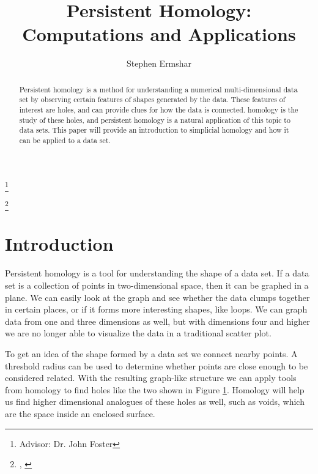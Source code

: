

\title[Persistent Homology]{Persistent Homology: Computations and Applications}
\author{Stephen Ermshar}
\address{Department of Mathematics, Walla Walla University, College Place, WA 99324}
\date{} %
\thanks{Advisor: Dr. John Foster}

\thanks{\tiny{\DTMtoday, \DTMcurrenttime}}
\rfoot{\hfill\newline\tiny{\DTMtoday, \DTMcurrenttime}}




\begin{abstract}
    Persistent homology is a method for understanding a numerical multi-dimensional data set by observing certain features of shapes generated by the data.
    These features of interest are holes, and can provide clues for how the data is connected.
    homology is the study of these holes, and persistent homology is a natural application of this topic to data sets.
    This paper will provide an introduction to simplicial homology and how it can be applied to a data set.
\end{abstract}
\maketitle

\section{Introduction}

Persistent homology is a tool for understanding the shape of a data set.
If a data set is a collection of points in two-dimensional space, then it can be graphed in a plane.
We can easily look at the graph and see whether the data clumps together in certain places, or if it forms more interesting shapes, like loops.
We can graph data from one and three dimensions as well, but with dimensions four and higher we are no longer able to visualize the data in a traditional scatter plot.

\begin{figure}[h]
    \centering
    \scalebox{0.75}{}
    \caption{}
    \label{fig:persistence-demo-r25}
\end{figure}

To get an idea of the shape formed by a data set we connect nearby points.
A threshold radius can be used to determine whether points are close enough to be considered related.
With the resulting graph-like structure we can apply tools from homology to find holes like the two shown in Figure \ref{fig:persistence-demo-r25}.
Homology will help us find higher dimensional analogues of these holes as well, such as voids, which are the space inside an enclosed surface.

